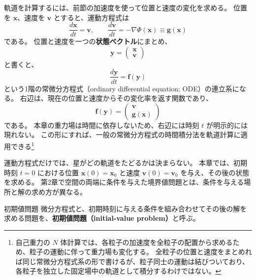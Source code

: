 軌道を計算するには、前節の加速度を使って位置と速度の変化を求める。
位置を $\boldsymbol{x}$、速度を $\boldsymbol{v}$ とすると、運動方程式は
\begin{equation}
 \frac{d\boldsymbol{x}}{dt}=\boldsymbol{v},\qquad
 \frac{d\boldsymbol{v}}{dt}=-\nabla\Phi(\boldsymbol{x})\equiv\boldsymbol{g}(\boldsymbol{x})
\label{eq:ch3-eom}
\end{equation}
である。
位置と速度を一つの\textbf{状態ベクトル}にまとめ、
\begin{equation}
 \boldsymbol{y}=\begin{pmatrix}\boldsymbol{x}\\\boldsymbol{v}\end{pmatrix}
\label{eq:ch3-state}
\end{equation}
と書くと、
\begin{equation}
 \frac{d\boldsymbol{y}}{dt}=\boldsymbol{f}(\boldsymbol{y})
\label{eq:ch3-first-order}
\end{equation}
という1階の常微分方程式（ordinary differential equation; ODE）の連立系になる。
右辺は、現在の位置と速度からその変化率を返す関数であり、
\begin{equation}
 \boldsymbol{f}(\boldsymbol{y})=\begin{pmatrix}\boldsymbol{v}\\\boldsymbol{g}(\boldsymbol{x})\end{pmatrix}
\label{eq:ch3-rhs}
\end{equation}
である。
本章の重力場は時間に依存しないため、右辺には時刻 $t$ が明示的には現れない。
この形にすれば、一般の常微分方程式の時間積分法を軌道計算に適用できる\footnote{
自己重力の $N$ 体計算では、各粒子の加速度を全粒子の配置から求めるため、粒子の運動に伴って重力場も変化する。
全粒子の位置と速度をまとめれば同じ常微分方程式系の形で書けるが、粒子同士の運動は結びついており、各粒子を独立した固定場中の軌道として積分するわけではない\cite{tomisaka2007}。
}

運動方程式だけでは、星がどの軌道をたどるかは決まらない。
本章では、初期時刻 $t=0$ における位置 $\boldsymbol{x}(0)=\boldsymbol{x}_0$ と速度 $\boldsymbol{v}(0)=\boldsymbol{v}_0$ を与え、その後の状態を求める。
第2章で空間の両端に条件を与えた境界値問題とは、条件を与える場所と解の求め方が異なる。

\begin{definitionbox}{初期値問題}
微分方程式と、初期時刻に与える条件を組み合わせてその後の解を求める問題を、\textbf{初期値問題（initial-value problem）}と呼ぶ。
\end{definitionbox}

